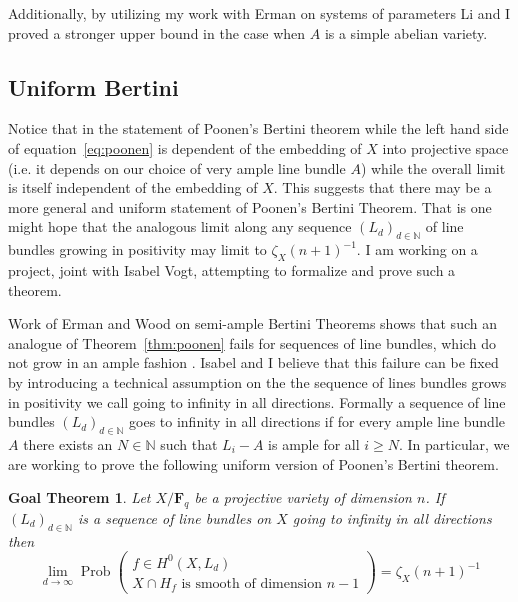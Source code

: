 \documentclass[10pt,reqno]{amsart}
\newtheorem{goalTheorem}[lemma]{Goal Theorem}
\theoremstyle{remark}
\newcommand{\Prob}{\operatorname{Prob}}
\newcommand{\fF}{\mathbf F}
\newcommand{\N}{\mathbb{N}}
\begin{document}
Additionally, by utilizing my work with Erman on systems of parameters Li and I proved a stronger upper bound in the case when $A$ is a simple abelian variety. 

\subsection{Uniform Bertini}

Notice that in the statement of Poonen's Bertini theorem while the left hand side of equation~\eqref{eq:poonen} is dependent of the embedding of $X$ into projective space (i.e. it depends on our choice of very ample line bundle $A$) while the overall limit is itself independent of the embedding of $X$. This suggests that there may be a more general and uniform statement of Poonen's Bertini Theorem. That is one might hope that the analogous limit along any sequence $(L_{d})_{d\in\N}$ of line bundles growing in positivity may limit to $\zeta_{X}(n+1)^{-1}$. I am working on a project, joint with Isabel Vogt, attempting to formalize and prove such a theorem.

Work of Erman and Wood on semi-ample Bertini Theorems shows that such an analogue of Theorem~\ref{thm:poonen} fails for sequences of line bundles, which do not grow in an ample fashion \cite{ermanWood15}. Isabel and I believe that this failure can be fixed by introducing a technical assumption on the the sequence of lines bundles grows in positivity we call going to infinity in all directions. Formally a sequence of line bundles  $\left(L_{d}\right)_{d\in\N}$ goes to infinity in all directions if for every ample line bundle $A$ there exists an $N\in \N$ such that $L_{i}-A$ is ample for all $i\geq N$. In particular, we are working to prove the following uniform version of Poonen's Bertini theorem.
 
\begin{goalTheorem}\label{gthm:effective-bertini}
Let $X/\fF_{q}$ be a projective variety of dimension $n$. If $\left(L_{d}\right)_{d\in\N}$ is a sequence of line bundles on $X$ going to infinity in all directions then 
\begin{equation}
\lim_{d\to \infty} \Prob\left(\begin{matrix} f\in H^0\left(X, L_{d}\right) \\ \text{$X\cap H_{f}$ is smooth of dimension $n-1$}\end{matrix}\right)=
\zeta_X(n+1)^{-1} 
\end{equation}
\end{goalTheorem}
\end{document}
